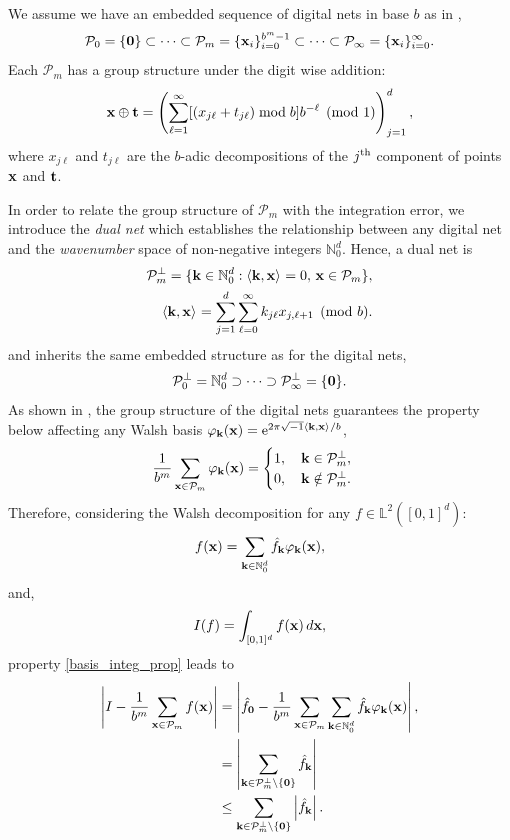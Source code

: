 We assume we have an embedded sequence of digital nets in base $b$ as in \cite[Sec. 2-3]{HicJim},
\[
\mathcal{P}_0=\{\boldsymbol{\mathbf{0}}\}\subset\dots\subset\mathcal{P}_m=\{\boldsymbol{\mathbf{x}}_i\}_{i=0}^{b^m-1}\subset\dots\subset\mathcal{P}_\infty=\{\boldsymbol{\mathbf{x}}_i\}_{i=0}^{\infty}.
\]
Each $\mathcal{P}_m$ has a group structure under the digit wise addition:
\[
\boldsymbol{\mathbf{x}} \oplus \boldsymbol{\mathbf{t}} = \left(\sum_{\ell=1}^{\infty} [(x_{j\ell} + t_{j\ell}) \bmod b] b^{-\ell} \pmod{1} \right)_{j=1}^d,
\]
where $x_{j\ell}$ and $t_{j\ell}$ are the $b$-adic decompositions of the $j^{\rm th}$ component of points $\boldsymbol{\mathbf{x}}$ and $\boldsymbol{\mathbf{t}}$.

In order to relate the group structure of $\mathcal{P}_m$ with the integration error, we introduce the \emph{dual net} which establishes the relationship between any digital net and the \emph{wavenumber} space of non-negative integers $\mathbb{N}_0^d$. Hence, a dual net is
\begin{align*}
\mathcal{P}_m^\perp=\{\boldsymbol{\mathbf{k}}\in\mathbb{N}_0^d:\left \langle \boldsymbol{\mathbf{k}}, \boldsymbol{\mathbf{x}} \right \rangle_{{}}=0,\, \boldsymbol{\mathbf{x}}\in\mathcal{P}_m\}, \\
\left \langle \boldsymbol{\mathbf{k}}, \boldsymbol{\mathbf{x}} \right \rangle_{{}} = \sum_{j=1}^{d} \sum_{\ell=0}^{\infty} k_{j\ell}x_{j,\ell+1}  \pmod b.
\end{align*}
and inherits the same embedded structure as for the digital nets,
\begin{equation}\label{dual_net_structure}
\mathcal{P}_0^\perp=\mathbb{N}_0^d\supset\dots\supset\mathcal{P}_\infty^\perp=\{\boldsymbol{\mathbf{0}}\}.
\end{equation}
As shown in \cite[Sec. 3]{HicJim}, the group structure of the digital nets guarantees the property below affecting any Walsh basis $\varphi_{\boldsymbol{\mathbf{k}}}(\boldsymbol{\mathbf{x}})=\text{e}^{2 \pi \sqrt{-1} \left \langle \boldsymbol{\mathbf{k}}, \boldsymbol{\mathbf{x}} \right \rangle_{{}}/b}$,
\begin{equation}\label{basis_integ_prop}
\frac{1}{b^m}\sum_{\boldsymbol{\mathbf{x}}\in\mathcal{P}_m}\varphi_{\boldsymbol{\mathbf{k}}}(\boldsymbol{\mathbf{x}})=
\begin{cases}
1,\quad \boldsymbol{\mathbf{k}}\in\mathcal{P}_m^\perp, \\
0,\quad \boldsymbol{\mathbf{k}}\notin\mathcal{P}_m^\perp.
\end{cases}
\end{equation}
Therefore, considering the Walsh decomposition for any $f\in \mathbb{L}^2([0,1]^d)$: \[
f(\boldsymbol{\mathbf{x}})=\sum_{\boldsymbol{\mathbf{k}}\in\mathbb{N}_0^d}\hat{f}_{\boldsymbol{\mathbf{k}}}\varphi_{\boldsymbol{\mathbf{k}}}(\boldsymbol{\mathbf{x}}), \]
and,
\[ I(f) = \int_{[0,1]^d} f(\boldsymbol{\mathbf{x}})\,d\boldsymbol{\mathbf{x}},\]
property \eqref{basis_integ_prop} leads to
\begin{align}
\nonumber
\left\lvert I - \frac{1}{b^m}\sum_{\boldsymbol{\mathbf{x}}\in\mathcal{P}_m}f(\boldsymbol{\mathbf{x}})\right\rvert &=
\left\lvert\hat{f}_{\boldsymbol{\mathbf{0}}} - \frac{1}{b^m}\sum_{\boldsymbol{\mathbf{x}}\in\mathcal{P}_m}\sum_{\boldsymbol{\mathbf{k}}\in\mathbb{N}_0^d}\hat{f}_{\boldsymbol{\mathbf{k}}}\varphi_{\boldsymbol{\mathbf{k}}}(\boldsymbol{\mathbf{x}})\right\rvert, \\
\nonumber
&= \left\lvert\sum_{\boldsymbol{\mathbf{k}}\in\mathcal{P}_m^\perp\setminus\{\boldsymbol{\mathbf{0}}\}}\hat{f}_{\boldsymbol{\mathbf{k}}}\right\rvert \\
& \leq \sum_{\boldsymbol{\mathbf{k}}\in\mathcal{P}_m^\perp\setminus\{\boldsymbol{\mathbf{0}}\}}\left\lvert\hat{f}_{\boldsymbol{\mathbf{k}}}\right\rvert. \label{3.1.err_bound}
\end{align}
